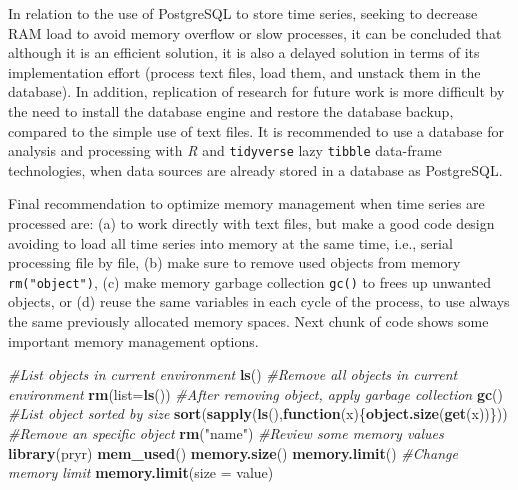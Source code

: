 \documentclass[12pt,twoside]{reedthesis}
\newenvironment{Shaded}{\begin{snugshade}}{\end{snugshade}}
\newcommand{\CommentTok}[1]{\textcolor[rgb]{0.56,0.35,0.01}{\textit{#1}}}
\newcommand{\ControlFlowTok}[1]{\textcolor[rgb]{0.13,0.29,0.53}{\textbf{#1}}}
\newcommand{\DataTypeTok}[1]{\textcolor[rgb]{0.13,0.29,0.53}{#1}}
\newcommand{\KeywordTok}[1]{\textcolor[rgb]{0.13,0.29,0.53}{\textbf{#1}}}
\newcommand{\NormalTok}[1]{#1}
\newcommand{\StringTok}[1]{\textcolor[rgb]{0.31,0.60,0.02}{#1}}
\begin{document}
In relation to the use of PostgreSQL to store time series, seeking to decrease RAM load to avoid memory overflow or slow processes, it can be concluded that although it is an efficient solution, it is also a delayed solution in terms of its implementation effort (process text files, load them, and unstack them in the database). In addition, replication of research for future work is more difficult by the need to install the database engine and restore the database backup, compared to the simple use of text files. It is recommended to use a database for analysis and processing with \emph{R} and \texttt{tidyverse} lazy \texttt{tibble} data-frame technologies, when data sources are already stored in a database as PostgreSQL.

Final recommendation to optimize memory management when time series are processed are: (a) to work directly with text files, but make a good code design avoiding to load all time series into memory at the same time, i.e., serial processing file by file, (b) make sure to remove used objects from memory \texttt{rm("object")}, (c) make memory garbage collection \texttt{gc()} to frees up unwanted objects, or (d) reuse the same variables in each cycle of the process, to use always the same previously allocated memory spaces. Next chunk of code shows some important memory management options.

\scriptsize

\vspace{0.4cm}
\begin{Shaded}
\begin{Highlighting}[]
    \CommentTok{#List objects in current environment}
      \KeywordTok{ls}\NormalTok{()}
    \CommentTok{#Remove all objects in current environment}
      \KeywordTok{rm}\NormalTok{(}\DataTypeTok{list=}\KeywordTok{ls}\NormalTok{())}
    \CommentTok{#After removing object, apply garbage collection}
      \KeywordTok{gc}\NormalTok{()}
    \CommentTok{#List object sorted by size}
      \KeywordTok{sort}\NormalTok{(}\KeywordTok{sapply}\NormalTok{(}\KeywordTok{ls}\NormalTok{(),}\ControlFlowTok{function}\NormalTok{(x)\{}\KeywordTok{object.size}\NormalTok{(}\KeywordTok{get}\NormalTok{(x))\}))}
    \CommentTok{#Remove an specific object}
      \KeywordTok{rm}\NormalTok{(}\StringTok{"name"}\NormalTok{)}
    \CommentTok{#Review some memory values}
      \KeywordTok{library}\NormalTok{(pryr)}
      \KeywordTok{mem_used}\NormalTok{()}
      \KeywordTok{memory.size}\NormalTok{()}
      \KeywordTok{memory.limit}\NormalTok{()}
    \CommentTok{#Change memory limit}
      \KeywordTok{memory.limit}\NormalTok{(}\DataTypeTok{size =}\NormalTok{ value)}
\end{Highlighting}
\end{Shaded}
\normalsize
\end{document}

